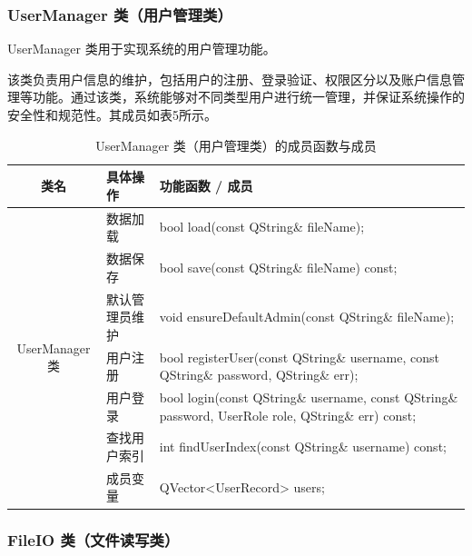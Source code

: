 \documentclass[UTF8,12pt,a4paper]{ctexart}
\begin{document}
\subsubsection{UserManager 类（用户管理类）}

UserManager 类用于实现系统的用户管理功能。

该类负责用户信息的维护，包括用户的注册、登录验证、权限区分以及账户信息管理等功能。通过该类，系统能够对不同类型用户进行统一管理，并保证系统操作的安全性和规范性。其成员如表5所示。

\begin{table}[H]
\centering
\caption{UserManager 类（用户管理类）的成员函数与成员}
\renewcommand{\arraystretch}{1.3}
\begin{tabular}{|
c|
>{\centering\arraybackslash}m{4cm}|
>{\centering\arraybackslash}m{9cm}|}
\hline
\textbf{类名} & \textbf{具体操作} & \textbf{功能函数 / 成员} \\
\hline
\multirow{8}{*}{UserManager 类}
& 数据加载
& bool load(const QString\& fileName); \\
\cline{2-3}

& 数据保存
& bool save(const QString\& fileName) const; \\
\cline{2-3}

& 默认管理员维护
& void ensureDefaultAdmin(const QString\& fileName); \\
\cline{2-3}

& 用户注册
& bool registerUser(const QString\& username,
                     const QString\& password,
                     QString\& err); \\
\cline{2-3}

& 用户登录
& bool login(const QString\& username,
              const QString\& password,
              UserRole role,
              QString\& err) const; \\
\cline{2-3}

& 查找用户索引
& int findUserIndex(const QString\& username) const; \\
\cline{2-3}

& 成员变量
& {\centering
  QVector<UserRecord> users;
}\\
\hline
\end{tabular}
\end{table}


\subsubsection{FileIO 类（文件读写类）}
\end{document}
